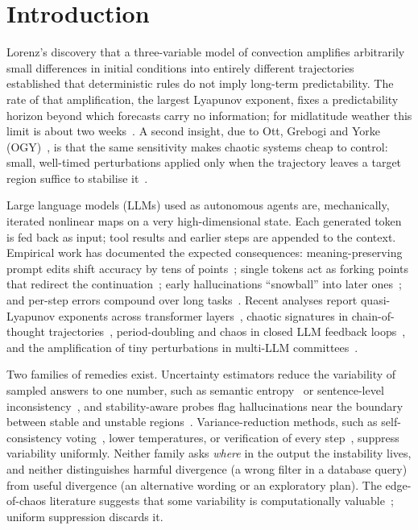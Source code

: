 \documentclass[preprint,12pt]{elsarticle}
\begin{document}
\section{Introduction}
\label{sec:intro}

Lorenz's discovery that a three-variable model of convection amplifies arbitrarily small differences in initial conditions into entirely different trajectories~\cite{lorenz1963} established that deterministic rules do not imply long-term predictability. The rate of that amplification, the largest Lyapunov exponent, fixes a predictability horizon beyond which forecasts carry no information; for midlatitude weather this limit is about two weeks~\cite{lorenz1969,zhang2019}. A second insight, due to Ott, Grebogi and Yorke (OGY)~\cite{ott1990}, is that the same sensitivity makes chaotic systems cheap to control: small, well-timed perturbations applied only when the trajectory leaves a target region suffice to stabilise it~\cite{shinbrot1993,boccaletti2000}.

Large language models (LLMs) used as autonomous agents are, mechanically, iterated nonlinear maps on a very high-dimensional state. Each generated token is fed back as input; tool results and earlier steps are appended to the context. Empirical work has documented the expected consequences: meaning-preserving prompt edits shift accuracy by tens of points~\cite{sclar2024,salinas2024}; single tokens act as forking points that redirect the continuation~\cite{bigelow2025}; early hallucinations ``snowball'' into later ones~\cite{zhang2024snowball}; and per-step errors compound over long tasks~\cite{sinha2026}. Recent analyses report quasi-Lyapunov exponents across transformer layers~\cite{li2025quasi}, chaotic signatures in chain-of-thought trajectories~\cite{jaca2026}, period-doubling and chaos in closed LLM feedback loops~\cite{jones2026}, and the amplification of tiny perturbations in multi-LLM committees~\cite{shimao2026}.

Two families of remedies exist. Uncertainty estimators reduce the variability of sampled answers to one number, such as semantic entropy~\cite{kuhn2023,farquhar2024} or sentence-level inconsistency~\cite{manakul2023}, and stability-aware probes flag hallucinations near the boundary between stable and unstable regions~\cite{luan2026}. Variance-reduction methods, such as self-consistency voting~\cite{wang2023sc}, lower temperatures, or verification of every step~\cite{lightman2024}, suppress variability uniformly. Neither family asks \emph{where} in the output the instability lives, and neither distinguishes harmful divergence (a wrong filter in a database query) from useful divergence (an alternative wording or an exploratory plan). The edge-of-chaos literature suggests that some variability is computationally valuable~\cite{bertschinger2004,poole2016,schoenholz2017}; uniform suppression discards it.
\end{document}
